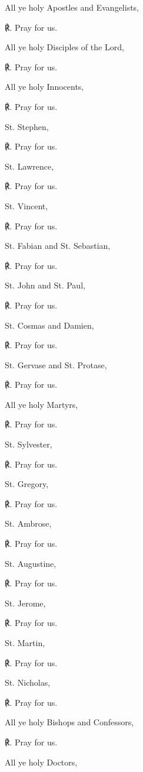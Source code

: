 \begin{multicols}{2}
All ye holy Apostles and Evangelists,\par
℟. Pray for us.\par\noindent
All ye holy Disciples of the Lord,\par
℟. Pray for us.\par\noindent
All ye holy Innocents,\par
℟. Pray for us.\par\noindent
St. Stephen,\par
℟. Pray for us.\par\noindent
St. Lawrence,\par
℟. Pray for us.\par\noindent
St. Vincent,\par
℟. Pray for us.\par\noindent
St. Fabian and St. Sebastian,\par
℟. Pray for us.\par\noindent
St. John and St. Paul,\par
℟. Pray for us.\par\noindent
St. Cosmas and Damien,\par
℟. Pray for us.\par\noindent
St. Gervase and St. Protase,\par
℟. Pray for us.\par\noindent
All ye holy Martyrs,\par
℟. Pray for us.\par\noindent
St. Sylvester,\par
℟. Pray for us.\par\noindent
St. Gregory,\par
℟. Pray for us.\par\noindent
St. Ambrose,\par
℟. Pray for us.\par\noindent
St. Augustine,\par
℟. Pray for us.\par\noindent
St. Jerome,\par
℟. Pray for us.\par\noindent
St. Martin,\par
℟. Pray for us.\par\noindent
St. Nicholas,\par
℟. Pray for us.\par\noindent
All ye holy Bishops and Confessors,\par
℟. Pray for us.\par\noindent
All ye holy Doctors,\par

\end{multicols}
